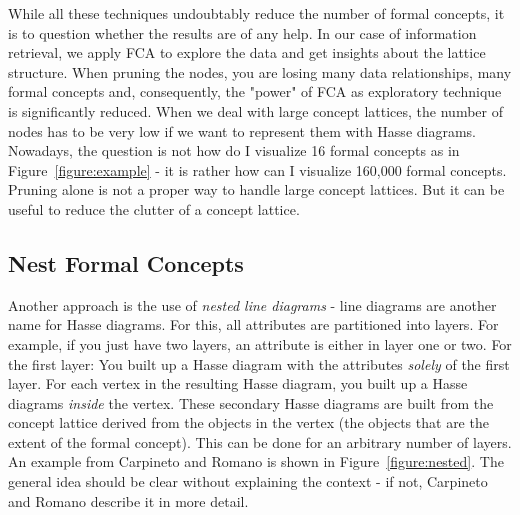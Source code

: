 \documentclass[11pt]{report}
\begin{document}
	While all these techniques undoubtably reduce the number of formal concepts, it is to question whether the results are of any help. In our case of information retrieval, we apply FCA to explore the data and get insights about the lattice structure. When pruning the nodes, you are losing many data relationships, many formal concepts and, consequently, the "power" of FCA as exploratory technique is significantly reduced. When we deal with large concept lattices, the number of nodes has to be very low if we want to represent them with Hasse diagrams. Nowadays, the question is not how do I visualize 16 formal concepts as in Figure~\ref{figure:example} - it is rather how can I visualize 160,000 formal concepts.\\
	
	Pruning alone is not a proper way to handle large concept lattices. But it can be useful to reduce the clutter of a concept lattice.
	
\subsection{Nest Formal Concepts}	

Another approach is the use of \textit{nested line diagrams} - line diagrams are another name for Hasse diagrams. For this, all attributes are partitioned into layers. For example, if you just have two layers, an attribute is either in layer one or two. For the first layer: You built up a Hasse diagram with the attributes \textit{solely} of the first layer. For each vertex in the resulting Hasse diagram, you built up a Hasse diagrams \textit{inside} the vertex. These secondary Hasse diagrams are built from the concept lattice derived from the objects in the vertex (the objects that are the extent of the formal concept). This can be done for an arbitrary number of layers. An example from Carpineto and Romano \cite{carpineto2004concept} is shown in Figure~\ref{figure:nested}. The general idea should be clear without explaining the context - if not, Carpineto and Romano \cite{carpineto2004concept} describe it in more detail. \\
\end{document}
